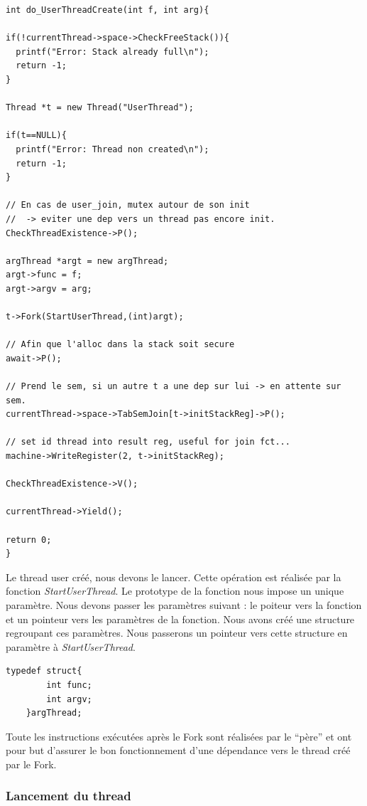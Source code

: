 \documentclass[a4paper,10pt]{article}
\begin{document}
\begin{lstlisting}[frame=single]
int do_UserThreadCreate(int f, int arg){

if(!currentThread->space->CheckFreeStack()){
  printf("Error: Stack already full\n");
  return -1;
}

Thread *t = new Thread("UserThread");

if(t==NULL){
  printf("Error: Thread non created\n");
  return -1;
}

// En cas de user_join, mutex autour de son init
//  -> eviter une dep vers un thread pas encore init.
CheckThreadExistence->P();

argThread *argt = new argThread;
argt->func = f;
argt->argv = arg;

t->Fork(StartUserThread,(int)argt);

// Afin que l'alloc dans la stack soit secure
await->P();

// Prend le sem, si un autre t a une dep sur lui -> en attente sur sem.
currentThread->space->TabSemJoin[t->initStackReg]->P();

// set id thread into result reg, useful for join fct...
machine->WriteRegister(2, t->initStackReg);

CheckThreadExistence->V();

currentThread->Yield();

return 0;
}
\end{lstlisting}
\newpage
Le thread user créé, nous devons le lancer. Cette opération est réalisée par la fonction \textit{StartUserThread}.
Le prototype de la fonction nous impose un unique paramètre. Nous devons passer les paramètres suivant : le poiteur vers la fonction et un pointeur vers les paramètres
de la fonction. Nous avons créé une structure regroupant ces paramètres. Nous passerons un pointeur vers cette structure en paramètre à \textit{StartUserThread}.
\begin{lstlisting}[frame=single]
 typedef struct{
		int func;
		int argv;
	}argThread;
\end{lstlisting}

Toute les instructions exécutées après le Fork sont réalisées par le ``père'' et ont pour but d'assurer
le bon fonctionnement d'une dépendance vers le thread créé par le Fork.

\subsubsection{Lancement du thread}
\end{document}
